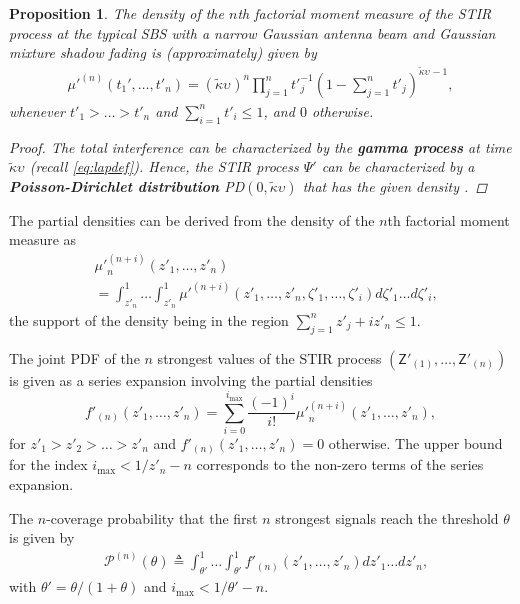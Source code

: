 \documentclass[lettersize,journal]{IEEEtran}
\newtheorem{prop}[theorem]{Proposition}
\begin{document}
\begin{prop}
  The density of the $n$th factorial moment measure of the STIR process at the typical SBS with a narrow Gaussian antenna beam and Gaussian mixture shadow fading is (approximately) given by
  \begin{align}
    \label{eq:factorialmoment}
    \mu'^{(n)}(t_1',\dots,t'_n) = (\tilde{\kappa}\upsilon_{})^n\prod_{j=1}^n{t'}_{j}^{-1}\left(1- \sum_{j=1}^nt'_j \right)^{\tilde{\kappa}\upsilon_{}-1},       
  \end{align}
  whenever $t'_1>\dots >t'_n$ and $\sum_{i=1}^n t'_i \leq 1$, and $0$ otherwise.
  \begin{proof}
    The total interference can be characterized by the \textbf{gamma process} at time $\tilde{\kappa}\upsilon$ \cite[Eq. 8]{pitman1997two} (recall \eqref{eq:lapdef}). Hence, the STIR process $\Psi'$ can be characterized by a \textbf{Poisson-Dirichlet distribution} PD$(0,\tilde{\kappa}\upsilon)$ that has the given density \cite[Eq. 2.3]{handa2009two}.
  \end{proof}
\end{prop}

The partial densities can be derived from the density of the $n$th factorial moment measure as \cite[Eq. 62]{7305791}
\begin{align}
  \label{eq:auxillary}
  &{\mu'}_n^{(n+i)}(z'_1,\dots,z'_n) \nonumber \\
  &= \int_{z'_n}^1 \dots \int_{z'_n}^1 {\mu'}^{(n+i)}(z'_1,\dots,z'_n,\zeta'_1,\dots,\zeta'_i) d\zeta'_1 \dots d\zeta'_i,
\end{align}
the support of the density being in the region $\sum_{j=1}^nz'_j+iz'_n \leq 1$. 


The joint PDF of the $n$ strongest values of the STIR process $(\mathsf{Z}'_{(1)}, \dots, \mathsf{Z}'_{(n)})$ is given as a series expansion involving the partial densities \cite[Eq. 64]{7305791}
\begin{equation}
  \label{eq:jointprobability}
  f'_{(n)}(z'_1,\dots,z'_n)= \sum^{i_{\text{max}}}_{i=0}\frac{(-1)^i}{i!}{\mu'}_n^{(n+i)}(z'_1,\dots,z'_n),
\end{equation}
for $z'_1>z'_2>\dots>z'_n$ and $f'_{(n)}(z'_1,\dots,z'_n) =0 $ otherwise. The upper bound for the index $i_{\text{max}}<1/z'_n-n$ corresponds to the non-zero terms of the series expansion. 

The $n$-coverage probability that the first $n$ strongest signals reach the threshold $\theta$ is given by
\begin{align}
  \label{eq:kprobability}
  &\mathcal{P}^{(n)}(\theta) \triangleq  \int_{\theta'}^1\dots \int_{\theta'}^1 f'_{(n)}({z'_1},\dots,{z'_n})dz'_1 \dots d{z'_n}, 
\end{align}
with $\theta'=\theta/(1+\theta)$ and $i_{\text{max}}<1/\theta'-n$.
\end{document}
